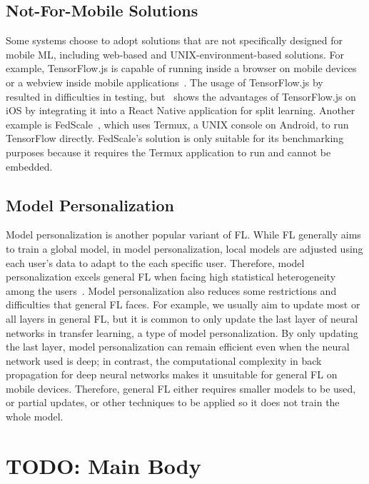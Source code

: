 \documentclass[conference]{IEEEtran}
\begin{document}
\subsection{Not-For-Mobile Solutions}

Some systems choose to adopt solutions that are not specifically designed for
mobile ML,
including web-based and UNIX-environment-based solutions.
For example,
TensorFlow.js is capable of running inside a browser on mobile devices or
a webview inside mobile applications~\cite{smilkov2019tensorflow}.
The usage of TensorFlow.js by~\cite{sriraman2022device} resulted in
difficulties in testing,
but~\cite{palanisamy2021spliteasy} shows the advantages of TensorFlow.js on iOS
by integrating it into a React Native application for split learning.
Another example is FedScale~\cite{lai2022fedscale},
which uses Termux, a UNIX console on Android,
to run TensorFlow directly.
FedScale's solution is only suitable for its benchmarking purposes because
it requires the Termux application to run and
cannot be embedded.

\subsection{Model Personalization}

Model personalization is another popular variant of FL.
While FL generally aims to train a global model,
in model personalization,
local models are adjusted using each user's data to
adapt to the each specific user.
Therefore, model personalization excels general FL when
facing high statistical heterogeneity among the users~\cite{kulkarni2020survey}.
Model personalization also reduces some restrictions and difficulties that
general FL faces.
For example,
we usually aim to update most or all layers in general FL,
but it is common to only update the last layer of neural networks in
transfer learning,
a type of model personalization.
By only updating the last layer,
model personalization can remain efficient even when
the neural network used is deep;
in contrast, the computational complexity in back propagation for
deep neural networks makes it unsuitable for general FL on mobile devices.
Therefore, general FL either requires smaller models to be used,
or partial updates,
or other techniques to be applied so it does not train the whole model.

\section{TODO: Main Body}
\end{document}
